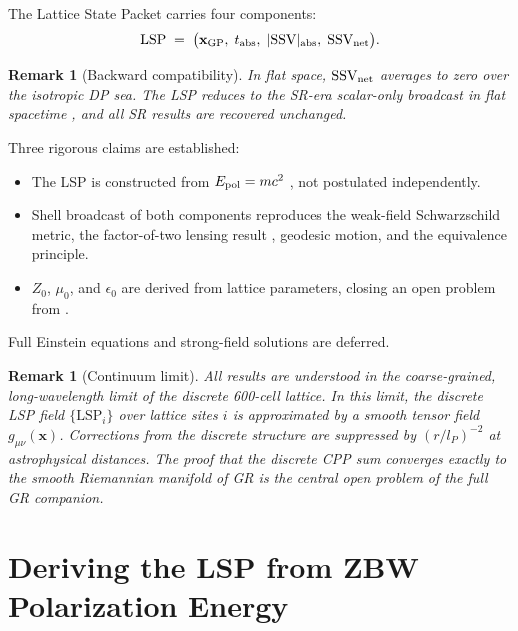 \documentclass[12pt]{article}
\newtheorem{remark}[theorem]{Remark}
\newcommand{\lP}{l_P}
\newcommand{\SSV}{\text{SSV}}
\newcommand{\LSP}{\text{LSP}}
\newcommand{\gmn}{g_{\mu\nu}}
\begin{document}
The Lattice State Packet carries four components:
\begin{equation}
  \LSP \;=\; \bigl(\mathbf{x}_{\rm GP},\; t_{\rm abs},\;
  |\SSV|_{\rm abs},\; \mathbf{\SSV}_{\rm net}\bigr).
  \label{eq:LSP}
\end{equation}

\begin{remark}[Backward compatibility]
In flat space, $\mathbf{\SSV}_{\rm net}$ averages to zero over the
isotropic DP sea.  The LSP reduces to the SR-era scalar-only
broadcast in flat spacetime \citep{abshier2026sr}, and all SR results
are recovered unchanged.
\end{remark}

Three rigorous claims are established:
\begin{itemize}[noitemsep]
  \item The LSP is constructed from $E_{\rm pol} = mc^2$
    \citep{abshier2026mass}, not postulated independently.
  \item Shell broadcast of both components reproduces the weak-field
    Schwarzschild metric, the factor-of-two lensing result
    \citep{eddington1920}, geodesic motion, and the equivalence
    principle.
  \item $Z_0$, $\mu_0$, and $\epsilon_0$ are derived from lattice
    parameters, closing an open problem from \citet{abshier2026zdc}.
\end{itemize}
Full Einstein equations and strong-field solutions are deferred.

\begin{remark}[Continuum limit]
All results are understood in the coarse-grained, long-wavelength limit
of the discrete 600-cell lattice.  In this limit, the discrete LSP
field $\{\LSP_i\}$ over lattice sites $i$ is approximated by a smooth
tensor field $\gmn(\mathbf{x})$.  Corrections from the discrete
structure are suppressed by $(r/\lP)^{-2}$ at astrophysical distances.
The proof that the discrete CPP sum converges exactly to the smooth
Riemannian manifold of GR is the central open problem of the full GR
companion.
\end{remark}

\section{Deriving the LSP from ZBW Polarization Energy}
\label{sec:LSP}
\end{document}
